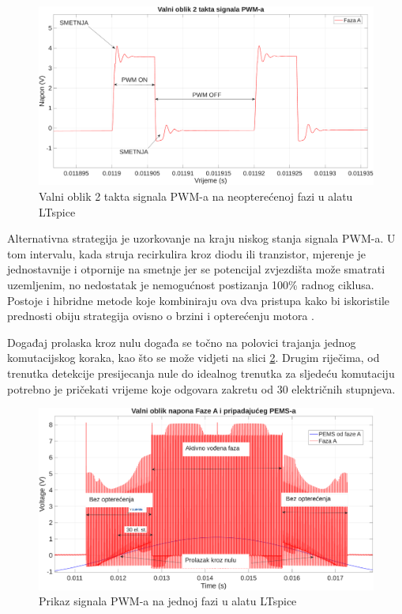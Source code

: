 \documentclass[diplomskirad, upload]{fer}
\begin{document}
\begin{figure}[h!]
	\centering
	\includegraphics[width=\textwidth]{csv/pwm_sum_ltspice.pdf}
	\caption{Valni oblik 2 takta signala PWM-a na neopterećenoj fazi u alatu LTspice}
	\label{fig:pwm_sum}
\end{figure}

Alternativna strategija je uzorkovanje na kraju niskog stanja signala PWM-a. U
tom intervalu, kada struja recirkulira kroz diodu ili tranzistor, mjerenje je
jednostavnije i otpornije na smetnje jer se potencijal zvjezdišta može smatrati
uzemljenim, no nedostatak je nemogućnost postizanja 100\% radnog
ciklusa\label{text:pwm_off}. Postoje i hibridne metode koje kombiniraju ova dva
pristupa kako bi iskoristile prednosti obiju strategija ovisno o brzini i
opterećenju motora \cite{ST_AN1946}.

Događaj prolaska kroz nulu događa se točno na polovici trajanja jednog
komutacijskog koraka, kao što se može vidjeti na slici \ref{fig:pwm_drive}.
Drugim riječima, od trenutka detekcije presijecanja nule do idealnog trenutka
za sljedeću komutaciju potrebno je pričekati vrijeme koje odgovara zakretu od
30 električnih stupnjeva.

\begin{figure}[h!]
	\centering
	\includegraphics[width=\textwidth]{csv/faza_ltspice.pdf}
	\caption{Prikaz signala PWM-a na jednoj fazi u alatu LTspice}
	\label{fig:pwm_drive}
\end{figure}
\end{document}
